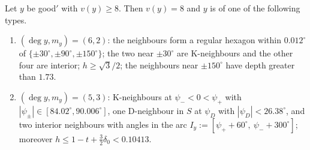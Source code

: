 \begin{lemma}[classification]\label{lem:IIclass}
Let $y$ be good$'$ with $v(y)\ge8$. Then $v(y)=8$ and $y$ is of one of the following types.
\begin{enumerate}[leftmargin=4.6em]
\item[\textup{(A)}] $(\deg y,m_y)=(6,2)$: the neighbours form a regular hexagon within $0.012^\circ$ of $\{\pm30^\circ,\pm90^\circ,\pm150^\circ\}$; the two near $\pm30^\circ$ are K-neighbours and the other four are interior; $h\ge\sqrt3/2$; the neighbours near $\pm150^\circ$ have depth greater than $1.73$.
\item[\textup{(Dt$_{\mathrm{II}}$)}] $(\deg y,m_y)=(5,3)$: K-neighbours at $\psi_-<0<\psi_+$ with $|\psi_\pm|\in[84.02^\circ,90.006^\circ]$, one D-neighbour in $S$ at $\psi_D$ with $|\psi_D|<26.38^\circ$, and two interior neighbours with angles in the arc $I_y:=[\psi_++60^\circ,\ \psi_-+300^\circ]$; moreover $h\le1-t+\frac32\delta_0<0.10413$.
\end{enumerate}
\end{lemma}
